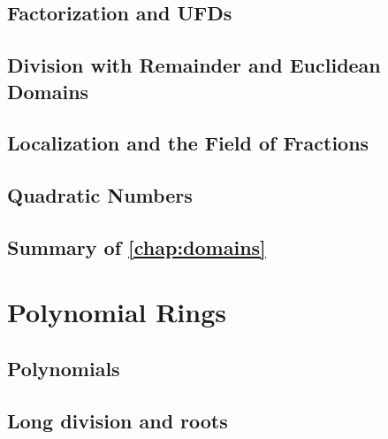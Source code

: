 \documentclass{memoir}
\begin{document}
    \section{Factorization and UFDs}
      \label{sec:ufds}
      
      \newpage

    \section{Division with Remainder and Euclidean Domains}
      \label{sec:eds}
      
      \newpage

    \section{Localization and the Field of Fractions}
      \label{sec:localization}
      
      \newpage

    \section{Quadratic Numbers}
      \label{sec:quad-num}
      
      \newpage

    \section*{Summary of \autoref{chap:domains}}
      


  \chapter{Polynomial Rings}
    \label{chap:poly}
    
    \newpage

    \section{Polynomials}
      \label{sec:polynomials}
      
      \newpage

    \section{Long division and roots}
      \label{sec:poly-div-alg}
      
      \newpage
\end{document}
